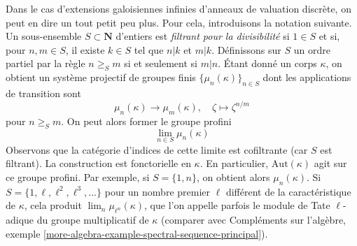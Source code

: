 \noindent
Dans le cas d'extensions galoisiennes infinies d'anneaux de valuation discrète,
on peut en dire un tout petit peu plus. Pour cela, introduisons la notation suivante.
Un sous-ensemble $S \subset \mathbf{N}$ d'entiers est {\it filtrant pour la divisibilité}
si $1 \in S$ et si, pour $n, m \in S$, il existe $k \in S$ tel que
$n | k$ et $m | k$. Définissons sur $S$ un ordre partiel par la règle
$n \geq_S m$ si et seulement si $m | n$. Étant donné un corps $\kappa$, on obtient
un système projectif de groupes finis $\{\mu_n(\kappa)\}_{n \in S}$
dont les applications de transition sont
$$
\mu_n(\kappa) \longrightarrow \mu_m(\kappa),\quad
\zeta \longmapsto \zeta^{n/m}
$$
pour $n \geq_S m$. On peut alors former le groupe profini
$$
\lim_{n \in S} \mu_n(\kappa)
$$
Observons que la catégorie d'indices de cette limite est cofiltrante (car $S$ est filtrant).
La construction est fonctorielle en $\kappa$. En particulier,
$\text{Aut}(\kappa)$ agit sur ce groupe profini.
Par exemple, si $S = \{1, n\}$, on obtient alors $\mu_n(\kappa)$.
Si $S = \{1, \ell, \ell^2, \ell^3, \ldots\}$ pour un nombre premier
$\ell$ différent de la caractéristique de $\kappa$, cela produit
$\lim_n \mu_{\ell^n}(\kappa)$,
que l'on appelle parfois le module de Tate $\ell$-adique du groupe
multiplicatif de $\kappa$ (comparer avec
Compléments sur l'algèbre, exemple
\ref{more-algebra-example-spectral-sequence-principal}).

